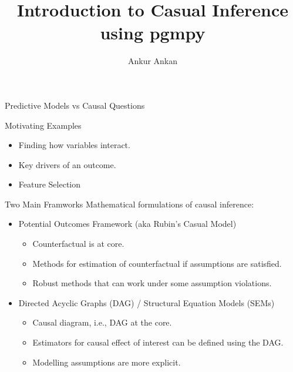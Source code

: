 \documentclass{beamer}
\begin{document}
\title[]{Introduction to Casual Inference using pgmpy}
\author{Ankur Ankan}
\date{}

\maketitle

\begin{frame}{Predictive Models vs Causal Questions}
\end{frame}

\begin{frame}{Motivating Examples}
	\begin{itemize}
		\item Finding how variables interact.
		\item Key drivers of an outcome.
		\item Feature Selection
	\end{itemize}
\end{frame}

\begin{frame}{Two Main Framworks}
	Mathematical formulations of causal inference:
	\begin{itemize}
		\item Potential Outcomes Framework (aka Rubin's Casual Model)
			\begin{itemize}
				\item Counterfactual is at core.
				\item Methods for estimation of counterfactual if assumptions are satisfied.
				\item Robust methods that can work under some assumption violations.
			\end{itemize}
		\item Directed Acyclic Graphs (DAG) / Structural Equation Models (SEMs)
			\begin{itemize}
				\item Causal diagram, i.e., DAG at the core.
				\item Estimators for causal effect of interest can be defined using the DAG.
				\item Modelling assumptions are more explicit.
			\end{itemize}
	\end{itemize}
\end{frame}
\end{document}
